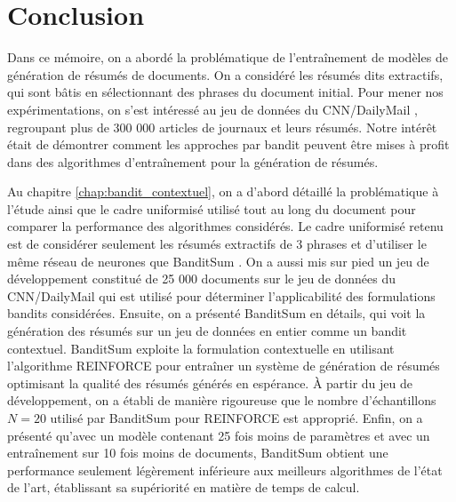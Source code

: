 \chapter*{Conclusion}           %
\label{chap:conclusion}         %

Dans ce mémoire, on a abordé la problématique de 
l'entraînement de modèles de génération de résumés de documents.
On a considéré les résumés dits extractifs, qui sont bâtis 
en sélectionnant des phrases du document initial.
Pour mener nos expérimentations, on s'est intéressé
au jeu de données du CNN/DailyMail \citep{hermann2015teaching}, 
regroupant plus de 300 000 articles de journaux et leurs résumés.
Notre intérêt était de démontrer comment les approches par bandit 
\citep{Robbins:1952} peuvent être mises à profit dans des algorithmes d'entraînement 
pour la génération de résumés.

Au chapitre \ref{chap:bandit_contextuel}, on a d'abord détaillé 
la problématique à l'étude ainsi que le cadre uniformisé 
utilisé tout au long du document pour comparer la performance
des algorithmes considérés.
Le cadre uniformisé retenu est de considérer seulement les résumés extractifs de 
3 phrases et d'utiliser le même réseau de neurones que BanditSum \citep{dong2018banditsum}.
On a aussi mis sur pied un jeu de développement constitué de 25 000 
documents sur le jeu de données du CNN/DailyMail qui est utilisé pour 
déterminer l'applicabilité des formulations bandits considérées.
Ensuite, on a présenté BanditSum en détails, qui voit la génération 
des résumés sur un jeu de données en entier comme un bandit contextuel.
BanditSum exploite la formulation contextuelle en utilisant l'algorithme REINFORCE \citep{williams1992simple} 
pour entraîner un système de génération de résumés optimisant la qualité des résumés 
générés en espérance.
À partir du jeu de développement, on a établi de manière rigoureuse 
que le nombre d'échantillons $N=20$ utilisé par BanditSum pour REINFORCE 
est approprié.
Enfin, on a présenté qu'avec un modèle contenant 25 fois moins de paramètres 
et avec un entraînement sur 10 fois moins de documents, BanditSum 
obtient une performance seulement légèrement inférieure aux meilleurs 
algorithmes de l'état de l'art, établissant sa supériorité 
en matière de temps de calcul.

